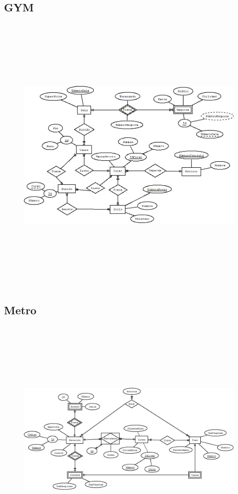 \documentclass[12pt, titlepage]{article}
\begin{document}
	\subsection{GYM}
	\begin{figure}[H]
		\begin{center}
			\includegraphics[width=16cm, height=14cm]{img/Gym.png}
			\label{fig:hasta-use4}
		\end{center}
	\end{figure}
	\subsection{Metro}
	\begin{figure}[H]
		\begin{center}
			\includegraphics[width=16cm, height=12cm]{img/Metro.png}
			\label{fig:hasta-use5}
		\end{center}
	\end{figure}
\end{document}
